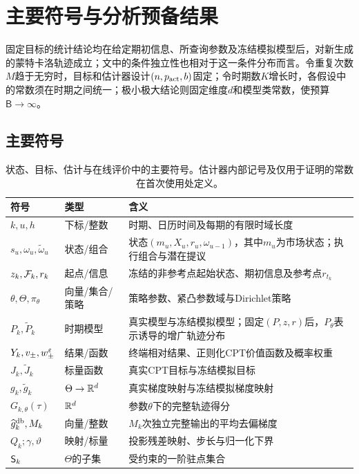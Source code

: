 \section{主要符号与分析预备结果}\label{app:notation}

固定目标的统计结论均在给定期初信息、所查询参数及冻结模拟模型后，对新生成的蒙特卡洛轨迹成立；文中的条件独立性也相对于这一条件分布而言。令重复次数$M$趋于无穷时，目标和估计器设计$(n,p_{\rm act},b)$固定；令时期数$K$增长时，各假设中的常数须在时期之间统一；极小极大结论则固定维度$d$和模型类常数，使预算$\mathsf B\to\infty$。

\subsection{主要符号}

\begin{table}[H]
\centering
\caption{状态、目标、估计与在线评价中的主要符号。估计器内部记号及仅用于证明的常数在首次使用处定义。}
\label{tab:notation-core}
\small
\begin{tabularx}{\textwidth}{@{}p{}p{}X@{}}
\toprule
符号 & 类型 & 含义 \\
\midrule
$k,u,h$ & 下标/整数 & 时期、日历时间及每期的有限时域长度 \\
$s_u,\omega_u,\widetilde\omega_u$ & 状态/组合 & 状态$(m_u,X_u,r_u,\omega_{u-1})$，其中$m_u$为市场状态；执行组合与潜在提议 \\
$z_k,\mathcal F_k,r_k$ & 起点/信息 & 冻结的非参考点起始状态、期初信息及参考点$r_{t_k}$ \\
$\theta,\Theta,\pi_\theta$ & 向量/集合/策略 & 策略参数、紧凸参数域与Dirichlet策略 \\
$P_k,\widetilde P_k$ & 时期模型 & 真实模型与冻结模拟模型；固定$(P,z,r)$后，$P_\theta$表示诱导的增广轨迹分布 \\
$Y_k,v_\pm,w_\pm^\varepsilon$ & 结果/函数 & 终端相对结果、正则化CPT价值函数及概率权重 \\
$J_k,\widetilde J_k$ & 标量函数 & 真实CPT目标与冻结模拟目标 \\
$g_k,\widetilde g_k$ & $\Theta\to\mathbb R^d$ & 真实梯度映射与冻结模拟梯度映射 \\
$G_{k,\theta}(\tau)$ & $\mathbb R^d$ & 参数$\theta$下的完整轨迹得分 \\
$\widehat g_k^{\mathrm{db}},M_k$ & 向量/整数 & $M_k$次独立完整输出的平均去偏梯度 \\
$Q_k;\gamma,\vartheta$ & 映射/标量 & 投影残差映射、步长与归一化下界 \\
$\mathsf S_k$ & $\Theta$的子集 & 受约束的一阶驻点集合 \\

\end{tabularx}
\end{table}
